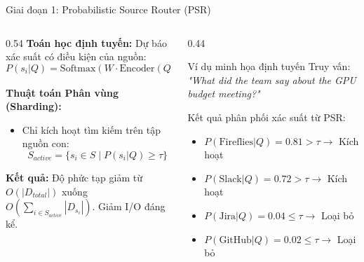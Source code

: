 \documentclass[aspectratio=169,11pt]{beamer}
\begin{document}
\begin{frame}{Giai đoạn 1: Probabilistic Source Router (PSR)}
\small
\begin{columns}[T]
\begin{column}{0.54\textwidth}
\textbf{Toán học định tuyến:} 
Dự báo xác suất có điều kiện của nguồn:
\vspace{-0.2cm}
{\footnotesize $$\boxed{P(s_i | Q) = \text{Softmax}(W \cdot \text{Encoder}(Q) + b)_i}$$}

\textbf{Thuật toán Phân vùng (Sharding):}
\begin{itemize}
    \item Chỉ kích hoạt tìm kiếm trên tập nguồn con:
\vspace{-0.2cm}
    {\footnotesize $$S_{active} = \{ s_i \in S \mid P(s_i | Q) \ge \tau \}$$}
\end{itemize}

\vspace{0.1cm}
\textbf{Kết quả:} 
Độ phức tạp giảm từ $O(|D_{total}|)$ xuống $O(\sum_{i \in S_{active}} |D_{s_i}|)$. Giảm I/O đáng kể.
\end{column}
\begin{column}{0.44\textwidth}
\begin{exampleblock}{Ví dụ minh họa định tuyến}
Truy vấn: \textit{"What did the team say about the GPU budget meeting?"}

\vspace{0.1cm}
Kết quả phân phối xác suất từ PSR:
\begin{itemize}
    \item $P(\text{Fireflies}|Q) = 0.81 > \tau \rightarrow$ Kích hoạt
    \item $P(\text{Slack}|Q) = 0.72 > \tau \rightarrow$ Kích hoạt
    \item $P(\text{Jira}|Q) = 0.04 \le \tau \rightarrow$ Loại bỏ
    \item $P(\text{GitHub}|Q) = 0.02 \le \tau \rightarrow$ Loại bỏ
\end{itemize}
\end{exampleblock}
\end{column}
\end{columns}
\end{frame}
\end{document}
